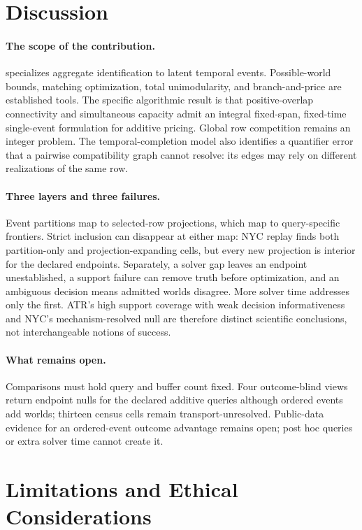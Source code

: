 \section{Discussion}

\paragraph{The scope of the contribution.}
\methodname{} specializes aggregate identification to latent temporal events.
Possible-world bounds, matching optimization, total unimodularity, and
branch-and-price are established tools. The specific algorithmic result is
that positive-overlap connectivity and simultaneous capacity admit an integral
fixed-span, fixed-time single-event formulation for additive pricing. Global
row competition remains an integer problem. The temporal-completion model
also identifies a quantifier error that a pairwise compatibility graph cannot
resolve: its edges may rely on different realizations of the same row.

\paragraph{Three layers and three failures.}
Event partitions map to selected-row projections, which map to query-specific
frontiers. Strict inclusion can disappear at either map: NYC replay finds both
partition-only and projection-expanding cells, but every new projection is
interior for the declared endpoints. Separately, a solver gap leaves an
endpoint unestablished, a support failure can remove truth before optimization,
and an ambiguous decision means admitted worlds disagree. More solver time
addresses only the first. ATR's high support coverage with weak decision
informativeness and NYC's mechanism-resolved null are therefore distinct
scientific conclusions, not interchangeable notions of success.

\paragraph{What remains open.}
Comparisons must hold query and buffer count fixed. Four outcome-blind views
return endpoint nulls for the declared additive queries although ordered events
add worlds; thirteen census cells remain transport-unresolved. Public-data
evidence for an ordered-event outcome advantage remains open; post hoc queries
or extra solver time cannot create it.

\section{Limitations and Ethical Considerations}

